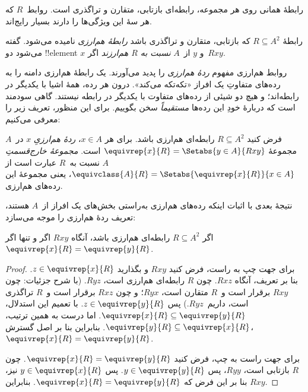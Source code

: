 \documentclass[../../../include/open-logic-section]{subfiles}
\begin{document}


رابطهٔ همانی روی هر مجموعه، رابطه‌ای بازتابی، متقارن و تراگذری است. روابط~$R$
که هر سهٔ این ویژگی‌ها را دارند بسیار رایج‌اند.

\begin{defn}
رابطهٔ $R \subseteq A^2$ که بازتابی، متقارن و تراگذری باشد
\emph{رابطهٔ هم‌ارزی} نامیده می‌شود. گفته می‌شود دو !!{element} $x$
و $y$ از~$A$ \emph{نسبت به $R$ هم‌ارزند} اگر~$Rxy$.
\end{defn}

روابط هم‌ارزی مفهوم \emph{ردهٔ هم‌ارزی} را پدید می‌آورند. یک رابطهٔ
هم‌ارزی دامنه را به رده‌های متفاوتِ یک افراز «تکه‌تکه می‌کند». درون هر
رده، همهٔ اشیا با یکدیگر در رابطه‌اند؛ و هیچ دو شیئی از رده‌های متفاوت
با یکدیگر در رابطه نیستند. گاهی سودمند است که دربارهٔ خودِ این رده‌ها
\emph{مستقیماً} سخن بگوییم. برای این منظور، تعریف زیر را معرفی می‌کنیم:

\begin{defn}
فرض کنید $R \subseteq A^2$ رابطه‌ای هم‌ارزی باشد. برای هر $x \in A$،
\emph{ردهٔ هم‌ارزیِ} $x$ در~$A$ مجموعهٔ $\equivrep{x}{R}
= \Setabs{y \in A}{Rxy}$ است. \emph{مجموعهٔ خارج‌قسمتِ} $A$ نسبت
به~$R$ عبارت است از
$\equivclass{A}{R} = \Setabs{\equivrep{x}{R}}{x \in A}$، یعنی مجموعهٔ
این رده‌های هم‌ارزی.
\end{defn}

نتیجهٔ بعدی با اثبات اینکه رده‌های هم‌ارزی به‌راستی بخش‌های یک افراز از~$A$
هستند، تعریف ردهٔ هم‌ارزی را موجه می‌سازد:

\begin{prop}
اگر $R \subseteq A^2$ رابطه‌ای هم‌ارزی باشد، آنگاه $Rxy$ اگر و تنها اگر
$\equivrep{x}{R} = \equivrep{y}{R}$.
\end{prop}

\begin{proof}
برای جهت چپ به راست، فرض کنید $Rxy$ و بگذارید $z \in
\equivrep{x}{R}$. بنا بر تعریف، آنگاه $Rxz$. چون $R$ رابطه‌ای هم‌ارزی
است، $Ryz$. (با شرح جزئیات: چون $Rxy$ برقرار است و~$R$ متقارن است، $Ryx$؛
و چون $Rxz$ برقرار است و~$R$ تراگذری است، داریم~$Ryz$.) پس
$z \in \equivrep{y}{R}$. با تعمیم
این استدلال، $\equivrep{x}{R} \subseteq \equivrep{y}{R}$. اما درست به
همین ترتیب، $\equivrep{y}{R} \subseteq \equivrep{x}{R}$. بنابراین بنا
بر اصل گسترش، $\equivrep{x}{R} =
\equivrep{y}{R}$.

برای جهت راست به چپ، فرض کنید $\equivrep{x}{R} =
\equivrep{y}{R}$. چون $R$ بازتابی است، $Ryy$، پس $y \in
\equivrep{y}{R}$. پس $y \in \equivrep{x}{R}$ نیز، بنا بر این فرض که
$\equivrep{x}{R} = \equivrep{y}{R}$. بنابراین $Rxy$.
\end{proof}
\end{document}
